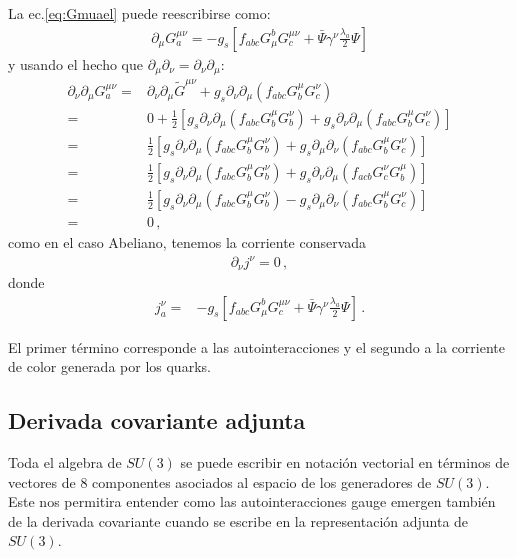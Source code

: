 La ec.\eqref{eq:Gmuael} puede reescribirse como:
\begin{align}
  \partial_\mu G^{\mu\nu}_a=-g_s\left[f_{abc}G^b_\mu G^{\mu\nu}_c+\bar{\Psi}\gamma^\nu\frac{\lambda_a}{2}\Psi  \right]
\end{align}
y usando el hecho que $\partial_\mu\partial_\nu=\partial_\nu\partial_\mu$:
\begin{align}
  \partial_\nu\partial_\mu G^{\mu\nu}_a=&\partial_\nu\partial_\mu\widetilde{G}^{\mu\nu}+g_s\partial_\nu\partial_\mu\left(f_{abc}G^\mu_bG^\nu_c\right)\nonumber\\
=&0+\frac{1}{2}\left[g_s\partial_\nu\partial_\mu\left(f_{abc}G^\mu_bG^\nu_b\right)+g_s\partial_\nu\partial_\mu\left(f_{abc}G^\mu_bG^\nu_c\right)\right]\nonumber\\
=&\frac{1}{2}\left[g_s\partial_\nu\partial_\mu\left(f_{abc}G^\mu_bG^\nu_b\right)+g_s\partial_\mu\partial_\nu\left(f_{abc}G^\mu_bG^\nu_c\right)\right]\nonumber\\
=&\frac{1}{2}\left[g_s\partial_\nu\partial_\mu\left(f_{abc}G^\mu_bG^\nu_b\right)+g_s\partial_\nu\partial_\mu\left(f_{acb}G^\nu_cG^\mu_b\right)\right]\nonumber\\
=&\frac{1}{2}\left[g_s\partial_\nu\partial_\mu\left(f_{abc}G^\mu_bG^\nu_b\right)-g_s\partial_\mu\partial_\nu\left(f_{abc}G^\mu_bG^\nu_c\right)\right]\nonumber\\
=&0\,,
\end{align}
como en el caso Abeliano, tenemos la corriente conservada
\begin{align}
  \partial_\nu j^\nu=0\,,
\end{align}
donde
\begin{align}
\label{eq:jnuqcd}
  j^\nu_a=&-g_s\left[f_{abc}G^b_\mu G^{\mu\nu}_c+\bar{\Psi}\gamma^\nu\frac{\lambda_a}{2}\Psi  \right]\,.
\end{align}

El primer término corresponde a las autointeracciones y el segundo a la corriente de color generada por los quarks.


\subsection{Derivada covariante adjunta}
Toda el algebra de $SU(3)$ se puede escribir en notación vectorial en términos de vectores de 8 componentes asociados al espacio de los generadores de $SU(3)$. Este nos permitira entender como las autointeracciones gauge emergen también de la derivada covariante cuando se escribe en la representación adjunta de $SU(3)$.

